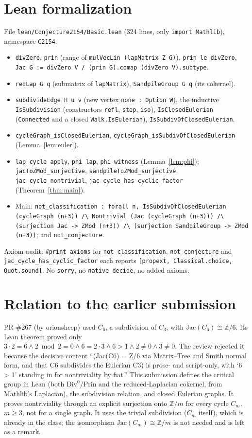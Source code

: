 \documentclass[11pt]{article}
\theoremstyle{definition}
\begin{document}
\section{Lean formalization}
File \texttt{lean/Conjecture2154/Basic.lean} (324 lines, only \texttt{import Mathlib}), namespace
\texttt{C2154}.
\begin{itemize}
\item \texttt{divZero}, \texttt{prin} (range of \texttt{mulVecLin (lapMatrix Z G)}), \texttt{prin\_le\_divZero},
\texttt{Jac G := divZero V / (prin G).comap (divZero V).subtype}.
\item \texttt{redLap G q} (submatrix of \texttt{lapMatrix}), \texttt{SandpileGroup G q} (its cokernel).
\item \texttt{subdivideEdge H u v} (new vertex \texttt{none : Option W}), the inductive
\texttt{IsSubdivision} (constructors \texttt{refl}, \texttt{step}, \texttt{iso}), \texttt{IsClosedEulerian}
(\texttt{Connected} and a closed \texttt{Walk.IsEulerian}), \texttt{IsSubdivOfClosedEulerian}.
\item \texttt{cycleGraph\_isClosedEulerian}, \texttt{cycleGraph\_isSubdivOfClosedEulerian} (Lemma~\ref{lem:euler}).
\item \texttt{lap\_cycle\_apply}, \texttt{phi\_lap}, \texttt{phi\_witness} (Lemma~\ref{lem:phi});
\texttt{jacToZMod\_surjective}, \texttt{sandpileToZMod\_surjective}, \texttt{jac\_cycle\_nontrivial},
\texttt{jac\_cycle\_has\_cyclic\_factor} (Theorem~\ref{thm:main}).
\item Main: \texttt{not\_classification : forall n, IsSubdivOfClosedEulerian (cycleGraph (n+3)) /\textbackslash{}
Nontrivial (Jac (cycleGraph (n+3))) /\textbackslash{} (surjection Jac -> ZMod (n+3)) /\textbackslash{}
(surjection SandpileGroup -> ZMod (n+3))}; and \texttt{not\_conjecture}.
\end{itemize}
Axiom audit: \texttt{\#print axioms} for \texttt{not\_classification}, \texttt{not\_conjecture} and
\texttt{jac\_cycle\_has\_cyclic\_factor} each reports \texttt{[propext, Classical.choice, Quot.sound]}.
No \texttt{sorry}, no \texttt{native\_decide}, no added axioms.

\section{Relation to the earlier submission}
PR \#267 (by orionsheep) used $C_6$, a subdivision of $C_3$, with $\mathrm{Jac}(C_6)\cong\mathbb Z/6$.
Its Lean theorem proved only
$3\cdot2=6\wedge 2\bmod 2=0\wedge 6=2\cdot3\wedge 6>1\wedge2\ne0\wedge3\ne0$. The review rejected
it because the decisive content ``(Jac(C6) = Z/6 via Matrix--Tree and Smith normal form, and that
C6 subdivides the Eulerian C3) is prose- and script-only, with `6 > 1' standing in for
nontriviality by fiat.'' This submission defines the critical group in Lean (both
$\mathrm{Div}^0/\mathrm{Prin}$ and the reduced-Laplacian cokernel, from Mathlib's Laplacian), the
subdivision relation, and closed Eulerian graphs. It proves nontriviality through an explicit
surjection onto $\mathbb Z/m$ for every cycle $C_m$, $m\ge3$, not for a single graph. It uses the
trivial subdivision ($C_m$ itself), which is already in the class; the isomorphism
$\mathrm{Jac}(C_m)\cong\mathbb Z/m$ is not needed and is left as a remark.
\end{document}
